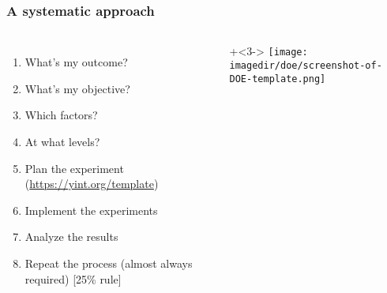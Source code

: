 \documentclass[11pt,aspectratio=169,mathserif]{beamer}
\begin{document}
\begin{frame}\frametitle{A systematic approach} 
	\begin{columns}[T]
			\Large
			\begin{enumerate}
			\item	What's my outcome? 
			\item	What's my objective? \pause
			\item	Which factors? 
			\item	At what levels?\pause
			\item	Plan the experiment {\small (\href{https://yint.org/template}{https://yint.org/template})}\pause
			\item	Implement the experiments \pause
			\item	Analyze the results\pause
			\item	Repeat the process \newline (almost always required) [25\% rule]
			\end{enumerate}
			
			\onslide+<3->{
				\texttt{[image: \\imagedir/doe/screenshot-of-DOE-template.png]}
			}
	\end{columns}
\end{frame}
\end{document}
